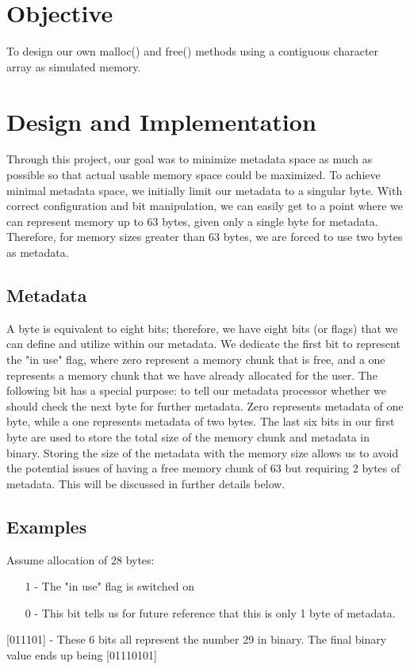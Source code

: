 \documentclass{article}
\title{\vspace{-0.5cm}\titletext}
\date{\vspace{-5ex}}
\begin{document}
    \maketitle
    \thispagestyle{fancy}
    \section*{Objective}
    To design our own malloc() and free() methods using a contiguous character array as simulated memory.

    \section*{Design and Implementation}
    Through this project, our goal was to minimize metadata space as much as possible so that actual usable memory space could be maximized. To achieve minimal metadata space, we initially limit our metadata to a singular byte. With correct configuration and bit manipulation, we can easily get to a point where we can represent memory up to 63 bytes, given only a single byte for metadata. Therefore, for memory sizes greater than 63 bytes, we are forced to use two bytes as metadata.

    \subsection*{Metadata}
    A byte is equivalent to eight bits; therefore, we have eight bits (or flags) that we can define and utilize within our metadata. We dedicate the first bit to represent the "in use" flag, where zero represent a memory chunk that is free, and a one represents a memory chunk that we have already allocated for the user. The following bit has a special purpose: to tell our metadata processor whether we should check the next byte for further metadata. Zero represents metadata of one byte, while a one represents metadata of two bytes. The last six bits in our first byte are used to store the total size of the memory chunk and metadata in binary. Storing the size of the metadata with the memory size allows us to avoid the potential issues of having a free memory chunk of 63 but requiring 2 bytes of metadata. This will be discussed in further details below.

    \subsection*{Examples}
    Assume allocation of 28 bytes:
    \begin{enumerate}
        \item[1 - ] The "in use" flag is switched on
        \item[0 - ] This bit tells us for future reference that this is only 1 byte of metadata.
    \end{enumerate}
    [011101] - These 6 bits all represent the number 29 in binary. The final binary value ends up being [01110101]
\end{document}
